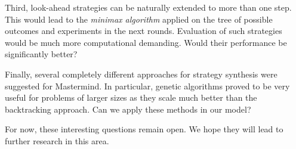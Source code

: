 Third, look-ahead strategies can be naturally extended to more than one step.
This would lead to the \emph{minimax algorithm} applied on the tree of
  possible outcomes and experiments in the next rounds.
Evaluation of such strategies would be much more computational demanding.
Would their performance be significantly better?

Finally, several completely different approaches for strategy synthesis
  were suggested for Mastermind.
In particular, genetic algorithms proved to be very useful for problems
  of larger sizes as they scale much better than the backtracking approach.
Can we apply these methods in our model?

For now, these interesting questions remain open.
We hope they will lead to further research in this area.
